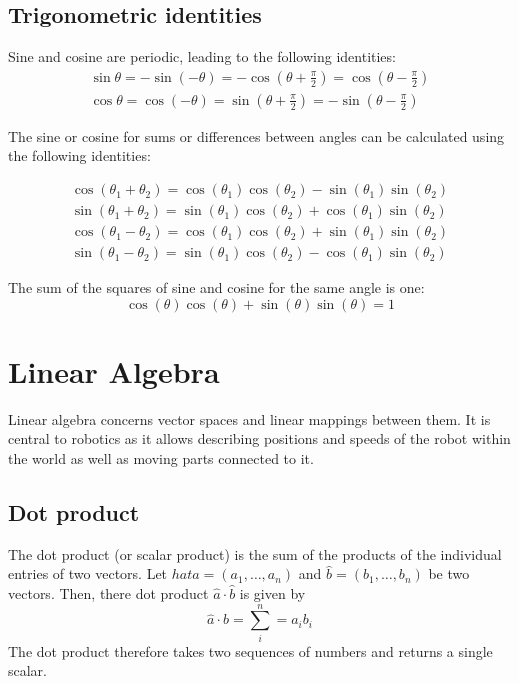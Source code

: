 \documentclass[paper=6.14in:9.21in,pagesize=pdftex,11pt,twoside,openright]{scrbook}
\begin{document}
\section{Trigonometric identities}
Sine and cosine are periodic, leading to the following identities:
\begin{eqnarray}
\sin\theta=-\sin(-\theta)=-\cos(\theta+\frac{\pi}{2})=\cos(\theta-\frac{\pi}{2})\\
\cos\theta=\cos(-\theta)=\sin(\theta+\frac{\pi}{2})=-\sin(\theta-\frac{\pi}{2})
\end{eqnarray}

The sine or cosine for sums or differences between angles can be calculated using the following identities:

\begin{eqnarray}
\cos(\theta_1+\theta_2)=\cos(\theta_1)\cos(\theta_2)-\sin(\theta_1)\sin(\theta_2)\\
\sin(\theta_1+\theta_2)=\sin(\theta_1)\cos(\theta_2)+\cos(\theta_1)\sin(\theta_2)\\
\cos(\theta_1-\theta_2)=\cos(\theta_1)\cos(\theta_2)+\sin(\theta_1)\sin(\theta_2)\\
\sin(\theta_1-\theta_2)=\sin(\theta_1)\cos(\theta_2)-\cos(\theta_1)\sin(\theta_2)
\end{eqnarray}

The sum of the squares of sine and cosine for the same angle is one:
\begin{equation}
\cos(\theta)\cos(\theta)+\sin(\theta)\sin(\theta)=1
\end{equation}

\chapter{Linear Algebra}
Linear algebra concerns vector spaces and linear mappings between them. It is central to robotics as it allows describing positions and speeds of the robot within the world as well as moving parts connected to it.

\section{Dot product}
The dot product (or scalar product) is the sum of the products of the individual entries of two vectors. Let $hat{a}=(a_1,\ldots,a_n)$ and $\hat{b}=(b_1,\ldots,b_n)$ be two vectors. Then, there dot product $\hat{a}\cdot\hat{b}$ is given by
\begin{equation}
\hat{a}\cdot\hat{b}=\sum_{i}^n=a_ib_i
\end{equation}
The dot product therefore takes two sequences of numbers and returns a single scalar.
\end{document}
